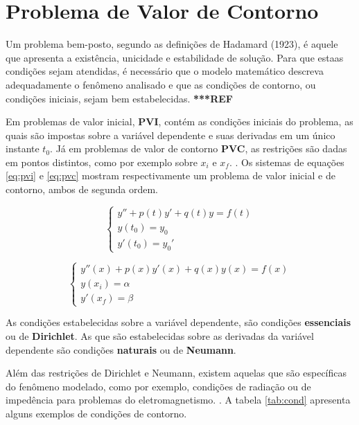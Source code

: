 \section{Problema de Valor de Contorno}


Um problema bem-posto, segundo as definições de Hadamard (1923), é aquele que 	apresenta a existência, unicidade e estabilidade de solução. Para que estaas condições sejam atendidas, é necessário que o modelo matemático descreva adequadamente o fenômeno analisado e que as condições de contorno, ou condições iniciais, sejam bem estabelecidas. \textbf{***REF}

Em problemas de valor inicial, \textbf{PVI}, contém as condições iniciais do problema, as quais são impostas sobre a variável dependente e suas derivadas em um único instante $t_0$. Já em problemas de valor de contorno \textbf{PVC}, as restrições são dadas em pontos distintos, como por exemplo sobre $x_i$ e $x_f$. \citep[p. 447]{boyce_diprima}. Os sistemas de equações \ref{eq:pvi} e \ref{eq:pvc} mostram respectivamente um problema de valor inicial e de contorno, ambos de segunda ordem.

\begin{equation}
	\label{eq:pvi}
	\begin{cases}
		y'' + p(t)y' + q(t)y = f(t) \\
		y(t_0) = y_0 \\
		y'(t_0) = y_0'
	\end{cases}
\end{equation}


\begin{equation}
	\label{eq:pvc}
	\begin{cases}
		y''(x) + p(x)y'(x) + q(x)y(x) = f(x) \\
		y(x_i) = \alpha \\
		y'(x_f) = \beta
	\end{cases}
\end{equation}

As condições estabelecidas sobre a variável dependente, são condições \textbf{essenciais} ou de \textbf{Dirichlet}. As que são estabelecidas sobre as derivadas da variável dependente são  condições \textbf{naturais} ou de \textbf{Neumann}.

Além das restrições de Dirichlet e Neumann, existem aquelas que são específicas do fenômeno modelado, como por exemplo, condições de radiação ou de impedência para problemas do eletromagnetismo. \citep[p. 20]{jin}. A tabela \ref{tab:cond} apresenta alguns exemplos de condições de contorno.


